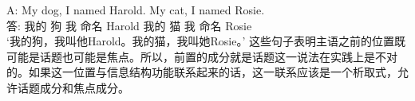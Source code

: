 \gll A: My dog, I named Harold. My cat, I named Rosie.\\
     答: 我的 狗 我 命名 Harold 我的 猫 我 命名 Rosie\\
\glt `我的狗，我叫他Harold。我的猫，我叫她Rosie。'
\z
这些句子表明主语之前的位置既可能是话题也可能是焦点。所以，前置的成分就是话题这一说法在实践上是不对的。如果这一位置与信息结构功能联系起来的话，这一联系应该是一个析取式，允许话题成分和焦点成分。

